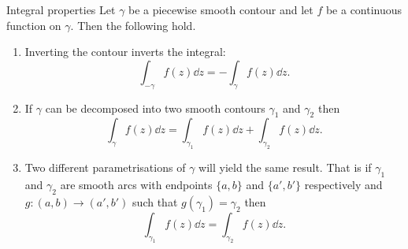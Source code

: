 \documentclass{article}
\begin{document}
    \begin{lemma}{Integral properties}{}
        Let \(\gamma\) be a piecewise smooth contour and let \(f\) be a continuous function on \(\gamma\).
        Then the following hold.
        \begin{enumerate}
            \item Inverting the contour inverts the integral:
            \[\int_{-\gamma} f(z) \dd{z} = -\int_{\gamma} f(z) \dd{z}.\]
            
            \item If \(\gamma\) can be decomposed into two smooth contours \(\gamma_1\) and \(\gamma_2\) then
            \[\int_\gamma f(z) \dd{z} = \int_{\gamma_1} f(z) \dd{z} + \int_{\gamma_2} f(z) \dd{z}.\]
            
            \item Two different parametrisations of \(\gamma\) will yield the same result.
            That is if \(\gamma_1\) and \(\gamma_2\) are smooth arcs with endpoints \(\{a, b\}\) and \(\{a', b'\}\) respectively and \(g\colon(a, b) \to (a', b')\) such that \(g(\gamma_1) = \gamma_2\) then
            \[\int_{\gamma_1} f(z) \dd{z} = \int_{\gamma_2} f(z) \dd{z}.\]
        \end{enumerate}
    \end{lemma}
\end{document}

